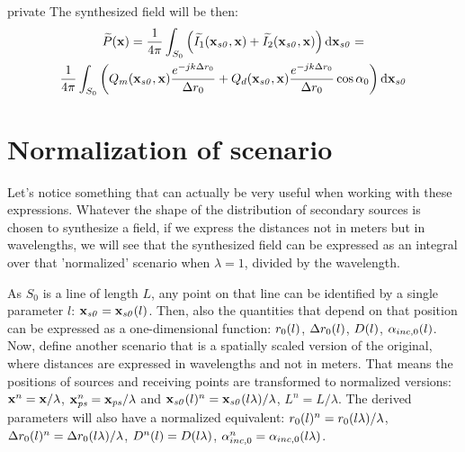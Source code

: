 \begin{shownto}{private}
The synthesized field will be then:
\begin{multline}
	\widetilde{P}(\PosTheo) = \frac{1}{4\pi} \int_{S_0} \left( \widetilde{I_{1}}(\PosTheo[section], \PosTheo) + \widetilde{I_2}(\PosTheo[section], \PosTheo) \right)
	\dif[\PosTheo[section]] = \\ \frac{1}{4\pi} \int_{S_0} \left( Q_m(\PosTheo[section], \PosTheo) \frac{e^{-jk\distLinePoint}}{\distLinePoint} + Q_d(\PosTheo[section], \PosTheo) \frac{e^{-jk\distLinePoint}}{\distLinePoint} \cos\normSecondPropAngleSection \right)
	\dif[\PosTheo[section]]
\end{multline} 

\section*{Normalization of scenario}
Let's notice something that can actually be very useful when working with these expressions. Whatever the shape of the distribution of secondary sources is chosen to synthesize a field, if we express the distances not in meters but in wavelengths, we will see that the synthesized field can be expressed as an integral over that 'normalized' scenario when $\lambda = 1$, divided by the wavelength.

As $S_0$ is a line of length $L$, any point on that line can be identified by a single parameter $l$: $\PosTheo[section] = \PosTheo[section](l)$. Then, also the quantities that depend on that position can be expressed as a one-dimensional function: $r_0(l)$, $\Delta {r_0}(l)$, $\Diag(l)$, $\alpha_{inc,0}(l)$. Now, define another scenario that is a spatially scaled version of the original, where distances are expressed in wavelengths and not in meters. That means the positions of sources and receiving points are transformed to normalized versions: $\PosTheo^{n} = \PosTheo/\lambda$, $\PosTheo[primarySource]^{n} = \PosTheo[primarySource]/\lambda$ and $\PosTheo[section](l)^{n} = \PosTheo[section](l\lambda)/\lambda$, $L^{n} = L/\lambda$. The derived parameters will also have a normalized equivalent: $r_0(l)^{n} = r_0(l\lambda)/\lambda$, $\Delta {r_0}(l)^{n} = \Delta {r_0}(l\lambda)/\lambda$, $\Diag^{n}(l) = \Diag(l\lambda)$, $\alpha_{inc,0}^{n} = \alpha_{inc,0}(l\lambda)$.


\end{shownto}
